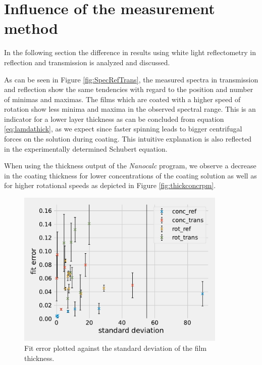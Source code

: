\section{Influence of the measurement method}
\label{sec:VglMeth}

In the following section the difference in results using white light reflectometry in reflection
and transmission is analyzed and discussed.

As can be seen in Figure \ref{fig:SpecRefTrans}, the measured spectra in transmission and reflection show the same tendencies with regard to the position and number of minimas and maximas. The films which are coated with a higher speed of rotation show less minima and maxima in the 
observed spectral range. This is an indicator for a lower layer thickness as can be concluded from equation \ref{eq:lamdathick}, as we expect since faster spinning leads to 
bigger centrifugal forces on the solution during coating. This intuitive explanation is also reflected in the experimentally determined Schubert equation. 

When using the thickness output of the \textit{Nanocalc} program, we observe a decrease in the coating thickness for lower concentrations of the coating solution as well as for higher rotational speeds as depicted in Figure \ref{fig:thickconcrpm}.

%     


\begin{figure}[h]
    \centering
    \includegraphics[width = 10cm]{Programmien/FitFehlergegenstd/FitFehlergegenStd.pdf}
    \caption{Fit error plotted against the standard deviation of the film thickness.}
    \label{fig:FitFehlergegenStd}
\end{figure}


